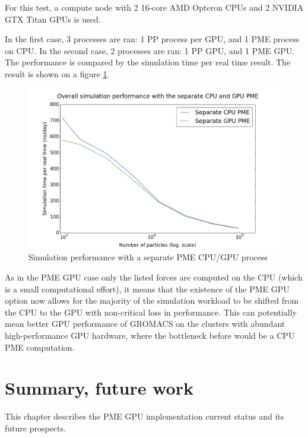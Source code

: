\documentclass[12pt,a4paper]{report}
\newcommand{\draft}[1]{#1}
\begin{document}
For this test, a compute node with 2 16-core AMD Opteron CPUs and 2 NVIDIA GTX Titan GPUs is used.

In the first case, 3 processes are ran: 1 PP process per GPU, and 1 PME process on CPU. In the second case, 2 processes are ran: 1 PP GPU, and 1 PME GPU. The performance is compared by the simulation time per real time result. The result is shown on a figure \ref{fig:sepGPU}.


\FloatBarrier
\begin{figure} [h!]
    \centering
    \includegraphics[width=1\textwidth]{pics/GPUCPU.png}
    \caption{Simulation performance with a separate PME CPU/GPU process}
    \label{fig:sepGPU}
\end{figure}
\FloatBarrier

As in the PME GPU case only the listed forces are computed on the CPU (which is a small computational effort), it means that the existence of the PME GPU option now allows for the majority of the simulation workload to be shifted from the CPU to the GPU with non-critical loss in performance. This can potentially mean better GPU performance of GROMACS on the clusters with abundant high-performance GPU hardware, where the bottleneck before would be a CPU PME computation.
\fi





\newpage
\chapter{Summary, future work}
This chapter describes the PME GPU implementation current status and its future prospects.
\end{document}
